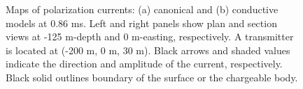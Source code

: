 \documentclass[extra,mreferee]{gji}
\begin{document}
\begin{figure}
  \caption{Maps of polarization currents: (a) canonical and (b) conductive models at 0.86 ms. Left and right panels show plan and section views at -125 m-depth and 0 m-easting, respectively. A transmitter is located at (-200 m, 0 m, 30 m). Black arrows and shaded values indicate the direction and amplitude of the current, respectively. Black solid outlines boundary of the surface or the chargeable body.}
  \label{F:Polarizationcurrent_early}
\end{figure}
\end{document}
